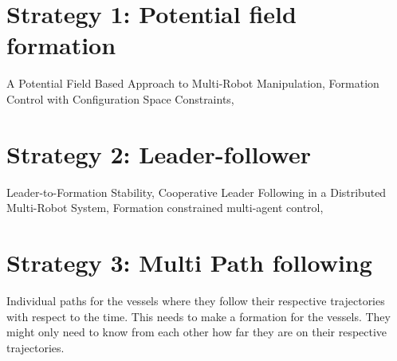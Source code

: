\section{Strategy 1: Potential field formation}
A Potential Field Based Approach to Multi-Robot Manipulation, Formation Control with Configuration Space Constraints, 
\section{Strategy 2: Leader-follower}
Leader-to-Formation Stability, Cooperative Leader Following in a Distributed Multi-Robot System, Formation constrained multi-agent control, 
\section{Strategy 3: Multi Path following}
Individual paths for the vessels where they follow their respective trajectories with respect to the time. This needs to make a formation for the vessels. They might only need to know from each other how far they are on their respective trajectories.


